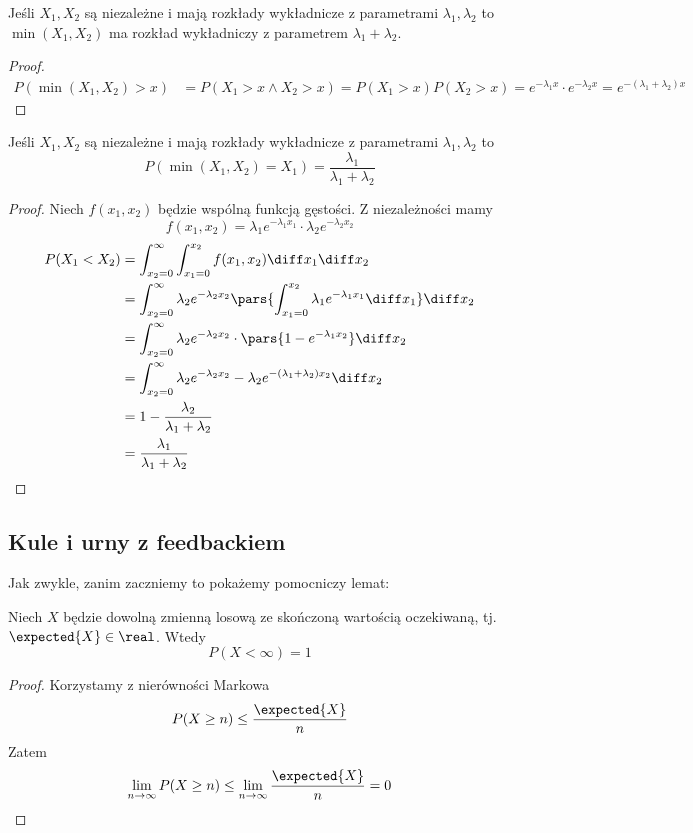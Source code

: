 \begin{theorem}[Lemat 8.5 P\&C]
    Jeśli \( X_1, X_2 \) są niezależne i mają rozkłady wykładnicze z parametrami \( \lambda_1, \lambda_2 \) to \( \min(X_1, X_2) \) ma rozkład wykładniczy z parametrem \( \lambda_1 + \lambda_2 \).
\end{theorem}
\begin{proof}
    \begin{align*}
        P(\min(X_1, X_2) > x) &= P(X_1 > x \land X_2 > x) = P(X_1 > x)P(X_2 > x) = e^{-\lambda_1 x} \cdot e^{-\lambda_2 x} = e^{-(\lambda_1 + \lambda_2)x}
    \end{align*}
\end{proof}

\begin{theorem}
    Jeśli \( X_1, X_2 \) są niezależne i mają rozkłady wykładnicze z parametrami \( \lambda_1, \lambda_2 \) to 
    \[
        P(\min(X_1, X_2) = X_1) = \frac{\lambda_1}{\lambda_1 + \lambda_2}
    \]
\end{theorem}
\begin{proof}
    Niech \( f(x_1, x_2) \) będzie wspólną funkcją gęstości.
    Z niezależności mamy
    \[
        f(x_1, x_2) = \lambda_1 e^{-\lambda_1 x_1} \cdot \lambda_2 e^{-\lambda_2 x_2}
    \]
    \begin{align*}
        P(X_1 < X_2)
            &= \int_{x_2=0}^\infty \int_{x_1=0}^{x_2} f(x_1, x_2) \diff x_1 \diff x_2 \\
            &= \int_{x_2=0}^\infty \lambda_2 e^{-\lambda_2 x_2} \pars{\int_{x_1=0}^{x_2} \lambda_1 e^{-\lambda_1 x_1} \diff x_1} \diff x_2 \\
            &= \int_{x_2=0}^\infty \lambda_2 e^{-\lambda_2 x_2} \cdot \pars{1 - e^{-\lambda_1 x_2}} \diff x_2 \\
            &= \int_{x_2=0}^\infty \lambda_2 e^{-\lambda_2 x_2}  - \lambda_2e^{-(\lambda_1 + \lambda_2) x_2} \diff x_2 \\
            &= 1 - \frac{\lambda_2}{\lambda_1 + \lambda_2} \\
            &= \frac{\lambda_1}{\lambda_1 + \lambda_2}
    \end{align*}
\end{proof}

\newpage
\subsection{Kule i urny z feedbackiem}

Jak zwykle, zanim zaczniemy to pokażemy pomocniczy lemat:
\begin{lemma}
    \label{if-expected-is-finite-then-variable-is-finite}
    Niech \( X \) będzie dowolną zmienną losową ze skończoną wartością oczekiwaną, tj. \( \expected{X} \in \real \).
    Wtedy
    \[
        P(X < \infty) = 1
    \]
\end{lemma}
\begin{proof}
    Korzystamy z nierówności Markowa
    \[
        P(X \geq n) \leq \frac{\expected{X}}{n}
    \]
    Zatem
    \[
        \lim_{n \rightarrow \infty} P(X \geq n) \leq \lim_{n \rightarrow \infty} \frac{\expected{X}}{n} = 0
    \]
\end{proof}


